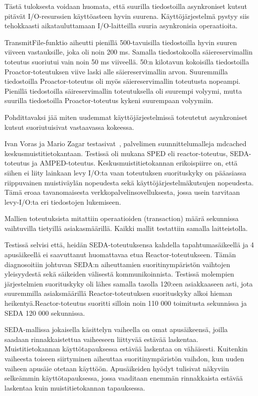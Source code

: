 \documentclass[finnish]{tktltiki2}
\theoremstyle{definition}
\theoremstyle{remark}
\begin{document}
Tästä tuloksesta voidaan huomata,
että suurilla tiedostoilla asynkroniset kutsut
pitävät I/O-resurssien käyttöasteen hyvin suurena.
Käyttöjärjestelmä pystyy siis tehokkaasti aikatauluttamaan
I/O-laitteilla suuria asynkronisia operaatioita.

TransmitFile-funktio aiheutti pienillä 500-tavuisilla tiedostoilla hyvin suuren viiveen
vastauksille, joka oli noin 200 ms. Samalla tiedostokoolla säiereservimallin toteutus
suoriutui vain noin 50 ms viiveellä.
50:n kilotavun kokoisilla tiedostoilla Proactor-toteutuksen
viive laski alle säiereservimallin arvon.
Suuremmilla tiedostoilla Proactor-toteutus oli myös säiereservimallin toteutusta nopeampi.
Pienillä tiedostoilla säireservimallin toteutuksella oli suurempi
volyymi, mutta suurilla tiedostoilla Proactor-toteutus
kykeni suurempaan volyymiin.

Pohdittavaksi jää miten uudemmat käyttöjärjestelmissä
toteutetut asynkroniset kutsut suoriutuisivat 
vastaavassa kokeessa.

Ivan Voras ja Mario Zagar testasivat~\cite{voras_characteristics_2009},
palvelimen suunnittelumalleja mdcached keskusmuistitietokantaan.
Testissä oli mukana SPED eli reactor-toteutus, SEDA-toteutus ja AMPED-toteutus.
Keskusmuistitietokannan erikoispiirre on, että siihen ei liity lainkaan levy I/O:ta
vaan toteutuksen suorituskyky on pääasiassa riippuvainen muistiväylän nopeudesta sekä
käyttöjärjestelmäkutsujen nopeudesta. Tämä eroaa tavanomaisesta
verkkopalvelinsovelluksesta, jossa usein tarvitaan levy-I/O:ta 
eri tiedostojen lukemiseen.

Mallien toteutuksista mitattiin operaatioiden (transaction) määrä sekunnissa vaihtuvilla tietyillä
asiakasmäärillä. Kaikki mallit testattiin samalla laitteistolla.


Testissä selvisi että, heidän SEDA-toteutuksensa kahdella tapahtumasäikeellä ja 4 apusäikeellä
ei saavuttanut huomattavaa
etua Reactor-toteutukseen. Tämän diagnosoitiin
johtuvan SEDA:n aiheuttamien suoritinympäristön vaihtojen yleisyydestä
sekä säikeiden välisestä kommunikoinnista.
Testissä molempien järjestelmien suorituskyky
oli lähes samalla tasolla 120:een asiakkaaseen asti, jota
suuremmilla asiaksmäärillä Reactor-toteutuksen suorituskyky alkoi
hieman heikentyä.Reactor-toteutus suoritti silloin noin 110 000 toimitusta sekunnissa
ja SEDA 120 000 sekunnissa.

SEDA-mallissa jokaisella käsittelyn vaiheella on omat apusäikeensä,
joilla saadaan rinnakkaistettua vaiheeseen liittyvää estävää laskentaa.
Muistitietokannan käyttötapauksessa estävää laskentaa on vähäisesti.
Kuitenkin vaiheesta toiseen siirtyminen aiheuttaa suoritinympäristön vaihdon,
kun uuden vaiheen apusäie otetaan käyttöön.
Apusäikeiden hyödyt
tulisivat näkyviin selkeämmin käyttötapauksessa, jossa vaaditaan enemmän
rinnakkaista estävää laskentaa kuin muistitietokannan tapauksessa.
\end{document}
